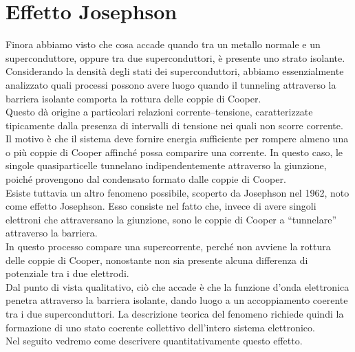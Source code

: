 \section{Effetto Josephson}
Finora abbiamo visto che cosa accade quando tra un metallo normale e un superconduttore, oppure tra due superconduttori, è presente uno strato isolante. Considerando la densità degli stati dei superconduttori, abbiamo essenzialmente analizzato quali processi possono avere luogo quando il tunneling attraverso la barriera isolante comporta la rottura delle coppie di Cooper.\\
Questo dà origine a particolari relazioni corrente--tensione, caratterizzate tipicamente dalla presenza di intervalli di tensione nei quali non scorre corrente. Il motivo è che il sistema deve fornire energia sufficiente per rompere almeno una o più coppie di Cooper affinché possa comparire una corrente. In questo caso, le singole quasiparticelle tunnelano indipendentemente attraverso la giunzione, poiché provengono dal condensato formato dalle coppie di Cooper.\\
Esiste tuttavia un altro fenomeno possibile, scoperto da Josephson nel 1962, noto come effetto Josephson. Esso consiste nel fatto che, invece di avere singoli elettroni che attraversano la giunzione, sono le coppie di Cooper a ``tunnelare'' attraverso la barriera.\\
In questo processo compare una supercorrente, perché non avviene la rottura delle coppie di Cooper, nonostante non sia presente alcuna differenza di potenziale tra i due elettrodi.\\
Dal punto di vista qualitativo, ciò che accade è che la funzione d'onda elettronica penetra attraverso la barriera isolante, dando luogo a un accoppiamento coerente tra i due superconduttori. La descrizione teorica del fenomeno richiede quindi la formazione di uno stato coerente collettivo dell'intero sistema elettronico.\\
Nel seguito vedremo come descrivere quantitativamente questo effetto.
